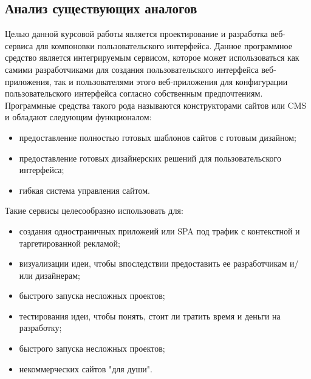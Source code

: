 \subsection{Анализ существующих аналогов}
\label{sec:analysis:analogues}

Целью данной курсовой работы является проектирование и разработка веб-сервиса для компоновки пользовательского интерфейса. 
Данное программное средство является интегрируемым сервисом, которое может использоваться как самими разработчиками для создания пользовательского интерфейса веб-приложения, так и пользователями этого веб-приложения для конфигурации пользовательского интерфейса согласно собственным предпочтениям.
Программные средства такого рода называются конструкторами сайтов или CMS и обладают следующим функционалом:

\begin{itemize}
  \item предоставление полностью готовых шаблонов сайтов с готовым дизайном;
  \item предоставление готовых дизайнерских решений для пользовательского интерфейса;
  \item гибкая система управления сайтом.
\end{itemize}

Такие сервисы целесообразно использовать для:
\begin{itemize}
  \item создания одностраничных приложеий или SPA под трафик с контекстной и таргетированной рекламой;
  \item визуализации идеи, чтобы впоследствии предоставить ее разработчикам и/или дизайнерам;
  \item быстрого запуска несложных проектов;
  \item тестирования идеи, чтобы понять, стоит ли тратить время и деньги на разработку;
  \item быстрого запуска несложных проектов;
  \item некоммерческих сайтов "для души".
\end{itemize}	

